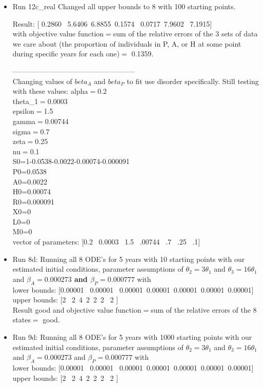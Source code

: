 \documentclass[12pt]{article}
\begin{document}
\begin{itemize}
\item Run 12c\_real Changed all upper bounds to 8 with 100 starting points.

Result: [    0.2860 \   5.6406\    6.8855\    0.1574  \  0.0717\    7.9602  \  7.1915]\\
with objective value function$=$sum of the relative errors of the 3 sets of data we care about (the proportion of individuals in P, A, or H at some point during specific years for each one)$=$  0.1359.





--------------------------------------------------- \\
Changing values of $beta_A$ and $beta_P$ to fit use disorder specifically. Still testing with these values: 
alpha$=$0.2 \\
theta\_{1}$=$0.0003 \\
epsilon$=$1.5 \\
gamma$=$0.00744\\
sigma$=$0.7 \\
zeta$=$0.25 \\
nu$=$0.1 \\

S0=1-0.0538-0.0022-0.00074-0.000091 \\
P0=0.0538 \\
A0=0.0022 \\
H0=0.00074 \\
R0=0.000091 \\
X0=0 \\
L0=0 \\
M0=0 \\

vector of parameters: [0.2 \ 0.0003 \ 1.5 \ .00744 \ .7 \ .25 \ .1]

\item Run 8d: Running all 8 ODE's for 5 years with 10 starting points with our estimated initial conditions, parameter assumptions of $\theta_2=3 \theta_1$ and $\theta_3=16\theta_1$ and \textbf{$\beta_A=0.000273$ and $\beta_P=0.000777$} with \\
lower bounds: [0.00001  \ 0.00001 \ 0.00001\ 0.00001\ 0.00001\ 0.00001\ 0.00001] \\
upper bounds: [2 \ 2\  4\  2\  2\   2 \ 2 ] \\

Result good and objective value function$=$sum of the relative errors of the 8 states$=$ good. 

\item Run 9d: Running all 8 ODE's for 5 years with 1000 starting points with our estimated initial conditions, parameter assumptions of $\theta_2=3 \theta_1$ and $\theta_3=16\theta_1$ and $\beta_A=0.000273$ and $\beta_P=0.000777$ with \\
lower bounds: [0.00001  \ 0.00001 \ 0.00001\ 0.00001\ 0.00001\ 0.00001\ 0.00001] \\
upper bounds: [2 \ 2\  4\  2\  2\   2 \ 2 ] \\


\end{itemize}
\end{document}
